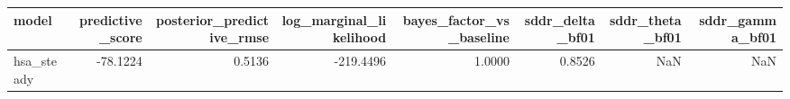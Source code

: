 \begin{tabular}{lrrrrrrr}
\toprule
model & predictive\_score & posterior\_predictive\_rmse & log\_marginal\_likelihood & bayes\_factor\_vs\_baseline & sddr\_delta\_bf01 & sddr\_theta\_bf01 & sddr\_gamma\_bf01 \\
\midrule
hsa\_steady & -78.1224 & 0.5136 & -219.4496 & 1.0000 & 0.8526 & NaN & NaN \\
\bottomrule
\end{tabular}

